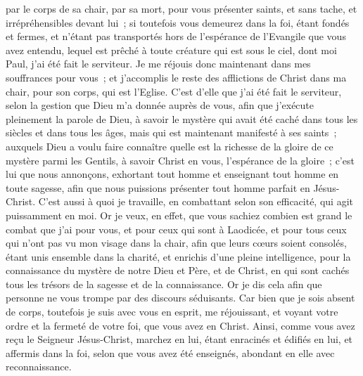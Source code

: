 \begin{multicols}{2}
par le corps de sa chair, par sa mort, pour vous présenter saints, et sans tache, et irrépréhensibles devant lui~;
si toutefois vous demeurez dans la foi, étant fondés et fermes, et n'étant pas transportés hors de l'espérance de l'Evangile que vous avez entendu, lequel est prêché à toute créature qui est sous le ciel, dont moi Paul, j'ai été fait le serviteur.
Je me réjouis donc maintenant dans mes souffrances pour vous~; et j'accomplis le reste des afflictions de Christ dans ma chair, pour son corps, qui est l'Eglise.
C'est d'elle que j'ai été fait le serviteur, selon la gestion que Dieu m'a donnée auprès de vous, afin que j'exécute pleinement la parole de Dieu,
à savoir le mystère qui avait été caché dans tous les siècles et dans tous les âges, mais qui est maintenant manifesté à ses saints~;
auxquels Dieu a voulu faire connaître quelle est la richesse de la gloire de ce mystère parmi les Gentils, à savoir Christ en vous, l'espérance de la gloire~;
c'est lui que nous annonçons, exhortant tout homme et enseignant tout homme en toute sagesse, afin que nous puissions présenter tout homme parfait en Jésus-Christ.
C'est aussi à quoi je travaille, en combattant selon son efficacité, qui agit puissamment en moi.
\VerseOne{}Or je veux, en effet, que vous sachiez combien est grand le combat que j'ai pour vous, et pour ceux qui sont à Laodicée, et pour tous ceux qui n'ont pas vu mon visage dans la chair,
afin que leurs cœurs soient consolés, étant unis ensemble dans la charité, et enrichis d'une pleine intelligence, pour la connaissance du mystère de notre Dieu et Père, et de Christ,
en qui sont cachés tous les trésors de la sagesse et de la connaissance.
Or je dis cela afin que personne ne vous trompe par des discours séduisants.
Car bien que je sois absent de corps, toutefois je suis avec vous en esprit, me réjouissant, et voyant votre ordre et la fermeté de votre foi, que vous avez en Christ.
Ainsi, comme vous avez reçu le Seigneur Jésus-Christ, marchez en lui,
étant enracinés et édifiés en lui, et affermis dans la foi, selon que vous avez été enseignés, abondant en elle avec reconnaissance.

\end{multicols}
